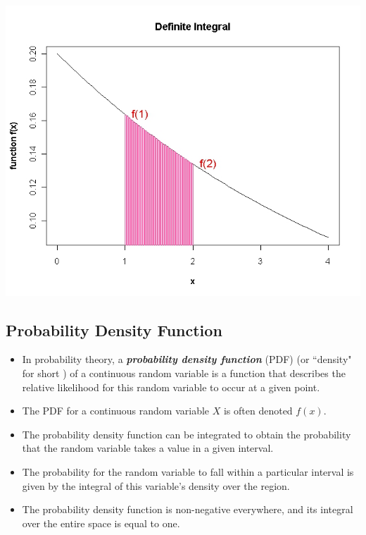 \begin{center}
\includegraphics[scale=0.35]{images/6ADefiniteIntegral}
\end{center}




\subsection*{Probability Density Function}
\begin{itemize}
	\item
	In probability theory, a \textbf{\emph{probability density function}} (PDF) (or ``density" for short ) of a continuous random variable is a function that describes the relative likelihood for this random variable to occur at a given point.
	
	\item The PDF for a continuous random variable $X$ is often denoted $f(x)$.
	
	\item The probability density function can be integrated to obtain the probability that the random variable takes a value in a given interval.
	
	\item The probability for the random variable to fall within a particular interval is given by the integral of this variable's density over the region.
	
	\item The probability density function is non-negative everywhere, and its integral over the entire space is equal to one.
\end{itemize}

